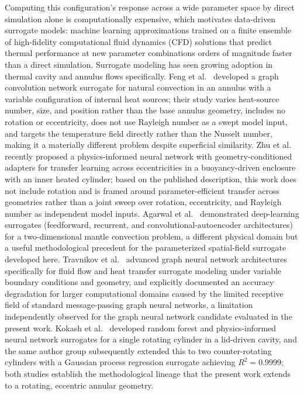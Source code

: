 Computing this configuration's response across a wide parameter space by direct simulation alone is computationally expensive, which motivates data-driven surrogate models: machine learning approximations trained on a finite ensemble of high-fidelity computational fluid dynamics (CFD) solutions that predict thermal performance at new parameter combinations orders of magnitude faster than a direct simulation. Surrogate modeling has seen growing adoption in thermal cavity and annulus flows specifically. Feng et al.~\cite{Feng2024} developed a graph convolution network surrogate for natural convection in an annulus with a variable configuration of internal heat sources; their study varies heat-source number, size, and position rather than the base annulus geometry, includes no rotation or eccentricity, does not use Rayleigh number as a swept model input, and targets the temperature field directly rather than the Nusselt number, making it a materially different problem despite superficial similarity. Zhu et al.~\cite{Zhu2026} recently proposed a physics-informed neural network with geometry-conditioned adapters for transfer learning across eccentricities in a buoyancy-driven enclosure with an inner heated cylinder; based on the published description, this work does not include rotation and is framed around parameter-efficient transfer across geometries rather than a joint sweep over rotation, eccentricity, and Rayleigh number as independent model inputs. Agarwal et al.~\cite{Agarwal2021} demonstrated deep-learning surrogates (feedforward, recurrent, and convolutional-autoencoder architectures) for a two-dimensional mantle convection problem, a different physical domain but a useful methodological precedent for the parameterized spatial-field surrogate developed here. Travnikov et al.~\cite{Travnikov2024} advanced graph neural network architectures specifically for fluid flow and heat transfer surrogate modeling under variable boundary conditions and geometry, and explicitly documented an accuracy degradation for larger computational domains caused by the limited receptive field of standard message-passing graph neural networks, a limitation independently observed for the graph neural network candidate evaluated in the present work. Kokash et al.~\cite{Kokash2024Energies} developed random forest and physics-informed neural network surrogates for a single rotating cylinder in a lid-driven cavity, and the same author group subsequently extended this to two counter-rotating cylinders with a Gaussian process regression surrogate achieving $R^2=0.9999$; both studies establish the methodological lineage that the present work extends to a rotating, eccentric annular geometry.

